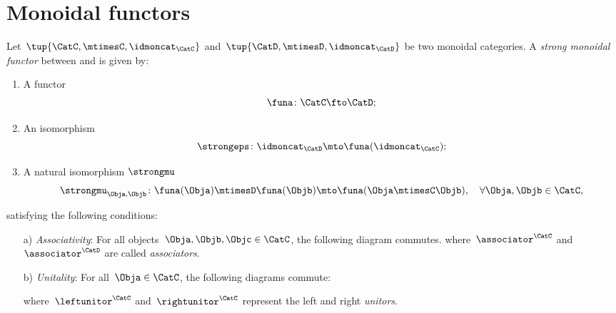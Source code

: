 

\section{Monoidal functors}
\label{sec:monoidal-functors}
\begin{ctdefinition}
  \label{def:strong-monoidal-functor}

  Let~$\tup{\CatC,\mtimesC,\idmoncat_{\CatC}}$ and~$\tup{\CatD,\mtimesD,\idmoncat_{\CatD}}$ be two monoidal categories.
  A \emph{strong monoidal functor} between \CatC and \CatD is given by:
  \begin{enumerate}
    \item A functor
    \begin{equation}
      \funa \colon \CatC \fto \CatD;
    \end{equation}
    \item An isomorphism
    \begin{equation}
      \strongeps\colon \idmoncat_{\CatD}\mto \funa(\idmoncat_{\CatC});
    \end{equation}
    \item A natural isomorphism $\strongmu$
    \begin{equation}
      \strongmu_{\Obja,\Objb}\colon \funa(\Obja)\mtimesD \funa(\Objb) \mto \funa(\Obja \mtimesC \Objb),\quad \forall \Obja,\Objb\in \CatC,
    \end{equation}
  \end{enumerate}
  satisfying the following conditions:
  \begin{enumerate}
    \item[a)] \emph{Associativity}: For all objects~$\Obja,\Objb,\Objc\in \CatC$, the following diagram commutes.
    where~$\associator^\CatC$ and~$\associator^\CatD$ are called \emph{associators}.
    \item[b)] \emph{Unitality}: For all~$\Obja\in \CatC$, the following diagrams commute:
    \begin{center}
    \end{center}
    where~$\leftunitor^\CatC$ and~$\rightunitor^\CatC$ represent the left and right \emph{unitors}.
  \end{enumerate}
\end{ctdefinition}

